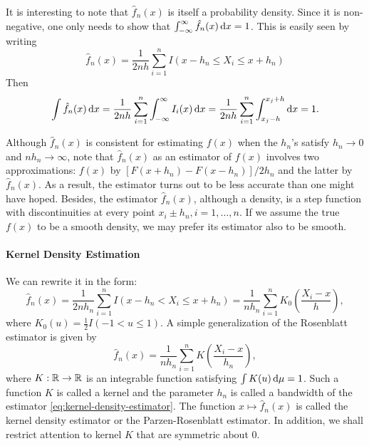 It is interesting to note that $\hat{f}_{n}(x)$ is itself a probability density. Since it is non-negative, one only needs to show that $\int_{-\infty}^{\infty}\hat{f}_{n}(x)\mathop{}\!\mathrm{d} x=1$. This is easily seen by writing
\begin{equation*}
	\hat{f}_{n}(x)=\frac{1}{2nh}\sum_{i=1}^{n}I(x-h_{n}\leq X_{i}\leq x+h_{n})
\end{equation*}
Then
\begin{equation*}
	\int\hat{f}_{n}(x)\mathop{}\!\mathrm{d} x=\frac{1}{2nh}\sum_{i=1}^{n}\int_{-\infty}^{\infty}I_i(x)\mathop{}\!\mathrm{d} x=\frac{1}{2nh}\sum_{i=1}^{n}\int_{x_j-h}^{x_j+h}\mathop{}\!\mathrm{d} x=1.
\end{equation*}

\begin{remark}
	Although $\hat{f}_{n}(x)$ is consistent for estimating $f(x)$ when the $h_{n}$'s satisfy $h_{n}\rightarrow0$ and $nh_{n}\rightarrow\infty$, note that $\hat{f}_{n}(x)$ as an estimator of $f(x)$ involves two approximations: $f(x)$ by $[F(x+h_{n})-F(x-h_{n})]/2h_{n}$ and the latter by $\hat{f}_{n}(x)$. As a result, the estimator turns out to be less accurate than one might have hoped.
	Besides, the estimator $\hat{f}_{n}(x)$, although a density, is a step function with discontinuities at every point $x_{i}\pm h_{n},i=1,\ldots,n$. If we assume the true $f(x)$ to be a smooth density, we may prefer its estimator also to be smooth.
\end{remark}

\paragraph{Kernel Density Estimation}

We can rewrite it in the form:
\begin{equation*}
	\hat{f}_{n}(x)=\frac{1}{2nh_{n}}\sum_{i=1}^{n}I\left(x-h_{n}<X_{i}\leq x+h_{n}\right)=\frac{1}{nh_{n}}\sum_{i=1}^{n}K_{0}\left(\frac{X_i-x}{h}\right),
\end{equation*}
where $K_0(u)=\frac{1}{2}I(-1<u\leq 1)$. A simple generalization of the Rosenblatt estimator is given by
\begin{equation}
	\label{eq:kernel-density-estimator}
	\hat{f}_{n}(x)=\frac{1}{nh_{n}}\sum_{i=1}^{n}K\left(\frac{X_{i}-x}{h_{n}}\right),
\end{equation}
where $K:{\mathbb R}\rightarrow{\mathbb R}$ is an integrable function satisfying $\int K(u)\mathop{}\!\mathrm{d}\mu=1$.
Such a function $K$ is called a kernel and the parameter $h_{n}$ is called a bandwidth of the estimator \eqref{eq:kernel-density-estimator}.
The function $x\mapsto\hat{f}_{n}(x)$ is called the kernel density estimator or the Parzen-Rosenblatt estimator.
In addition, we shall restrict attention to kernel $K$ that are symmetric about $0$.


